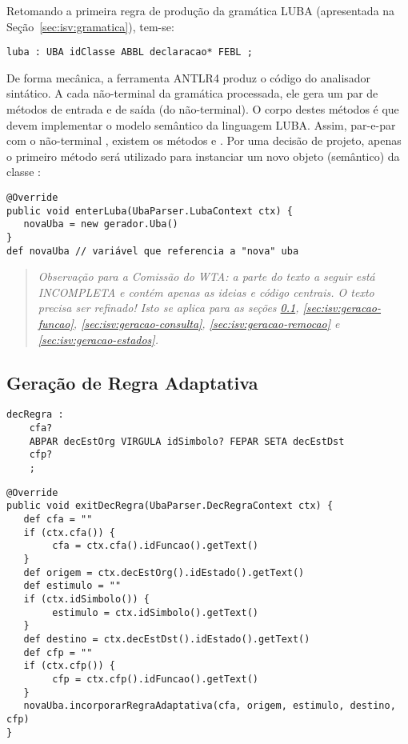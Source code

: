 Retomando a primeira regra de produção da gramática LUBA (apresentada na Seção~\ref{sec:isv:gramatica}), tem-se:

\begin{lstlisting}[style=antlr]
luba : UBA idClasse ABBL declaracao* FEBL ;
\end{lstlisting}

De forma mecânica, a ferramenta ANTLR4 produz o código do analisador sintático. A cada não-terminal da gramática processada, ele gera um par de métodos de entrada e de saída (do não-terminal). O corpo destes métodos é que devem implementar o modelo semântico da linguagem LUBA. Assim, par-e-par com o não-terminal , existem os métodos  e . Por uma decisão de projeto, apenas o primeiro método será utilizado para instanciar um novo objeto (semântico) da classe :

\begin{lstlisting}
@Override
public void enterLuba(UbaParser.LubaContext ctx) {
   novaUba = new gerador.Uba()
}
def novaUba // variável que referencia a "nova" uba
\end{lstlisting}

   \begin{quote}
   \textit{Observação para a Comissão do WTA: a parte do texto a seguir está INCOMPLETA e contém apenas as ideias e código centrais. O texto precisa ser refinado! Isto se aplica para as seções \ref{sec:isv:geracao-regra}, \ref{sec:isv:geracao-funcao}, \ref{sec:isv:geracao-consulta}, \ref{sec:isv:geracao-remocao} e \ref{sec:isv:geracao-estados}.}
   \end{quote}

\subsection{Geração de Regra Adaptativa}
\label{sec:isv:geracao-regra}

\begin{lstlisting}[style=antlr]
decRegra :
	cfa?
	ABPAR decEstOrg VIRGULA idSimbolo? FEPAR SETA decEstDst
	cfp?
	;
\end{lstlisting}

\begin{lstlisting}
@Override
public void exitDecRegra(UbaParser.DecRegraContext ctx) {
   def cfa = ""
   if (ctx.cfa()) {
        cfa = ctx.cfa().idFuncao().getText()
   }
   def origem = ctx.decEstOrg().idEstado().getText()
   def estimulo = ""
   if (ctx.idSimbolo()) {
        estimulo = ctx.idSimbolo().getText()
   }
   def destino = ctx.decEstDst().idEstado().getText()
   def cfp = ""
   if (ctx.cfp()) {
        cfp = ctx.cfp().idFuncao().getText()
   }
   novaUba.incorporarRegraAdaptativa(cfa, origem, estimulo, destino, cfp)
}
\end{lstlisting}


